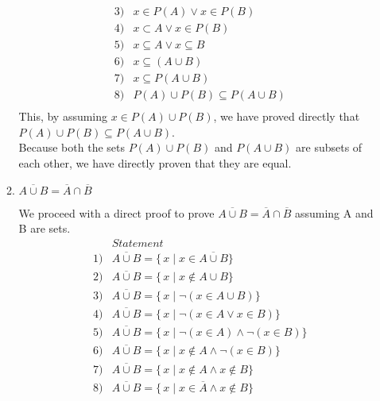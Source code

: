 \documentclass[11pt]{article}
\begin{document}
\begin{justify}
\begin{enumerate}
\begin{enumerate}
\begin{mdframed}
\begin{align*}
        3) &x \in P(A) \lor x \in P(B) \tag{3. def of union} \\
        4) &x \subset A \lor x \in P(B) \tag{4. def of power set} \\
        5) &x \subseteq A \lor x \subseteq B \tag{5. def of power set} \\
        6) &x \subseteq (A \cup B) \tag{6. definition of union} \\
        7) &x \subseteq P(A \cup B) \tag{7. def of power set} \\
        8) &P(A) \cup P(B) \subseteq P(A \cup B) \tag{8. def of subset} \\
    \end{align*}
    This, by assuming $x \in P(A) \cup P(B)$, we have proved directly that $P(A) \cup P(B) \subseteq P(A \cup B)$. \\
    Because both the sets $P(A) \cup P(B)$ and $P(A \cup B)$ are subsets of each other, we have directly proven that they are equal.
\end{mdframed}
\item $\overline{A \cup B} = \overline{A} \cap \overline{B}$
\begin{mdframed}
    We proceed with a direct proof to prove $\overline{A \cup B} = \overline{A} \cap \overline{B}$ assuming A and B are sets.
    \begin{align*}
        &Statement \tag{Reason} \\
        1) &\overline{A \cup B} = \{\, x \mid x \in \overline{A \cup B} \} \tag{1. Given} \\
        2) &\overline{A \cup B} = \{\, x \mid x \notin A \cup B \} \tag{2. def of complement} \\
        3) &\overline{A \cup B} = \{\, x \mid \neg(x \in A \cup B)\} \tag{3. def of not element in } \\
        4) &\overline{A \cup B} = \{\, x \mid \neg(x \in A \lor x \in B)\} \tag{4. def of union} \\
        5) &\overline{A \cup B} = \{\, x \mid \neg(x \in A) \land \neg(x \in B)\} \tag{5. De Morgan's Law} \\
        6) &\overline{A \cup B} = \{\, x \mid x \notin A \land \neg(x \in B)\} \tag{6. def of not element in} \\
        7) &\overline{A \cup B} = \{\, x \mid x \notin A \land x \notin B\} \tag{7. def of not element in} \\
        8) &\overline{A \cup B} = \{\, x \mid x \in \overline{A} \land x \notin B\} \tag{8. def of complement} \\

\end{align*}
\end{mdframed}
\end{enumerate}
\end{enumerate}
\end{justify}
\end{document}
